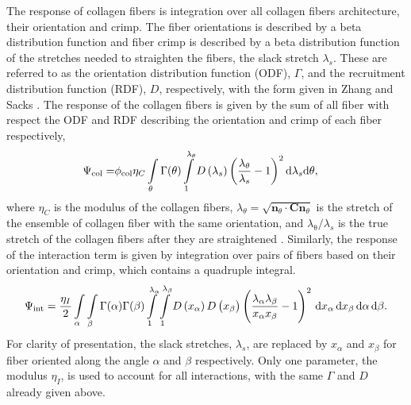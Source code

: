 	The response of collagen fibers is integration over all collagen fibers architecture, their orientation and crimp. The fiber orientations is described by a beta distribution function and fiber crimp is described by a beta distribution function of the stretches needed to straighten the fibers, the slack stretch $\lambda_s$. These are referred to as the orientation distribution function (ODF), $\Gamma$, and the recruitment distribution function (RDF), $D$, respectively, with the form given in Zhang and Sacks \cite{zhang_meso_2016, zhang_modeling_2017, sacks_novel_2016}. The response of the collagen fibers is given by the sum of all fiber with respect the ODF and RDF describing the orientation and crimp of each fiber respectively,
\begin{equation} \label{eqn:collagen}
\begin{aligned}
\Psi_\mathrm{col} =& \phi_\mathrm{col} \eta_C \int\displaylimits_\theta \Gamma(\theta) 
\int\displaylimits_1^{\lambda_\theta} D\left(\lambda_s \right) \left( \frac{\lambda_\theta}{\lambda_s} - 1\right)^2 \mathrm{d}\lambda_s \mathrm{d}\theta,
\end{aligned}
\end{equation}
where $\eta_C$ is the modulus of the collagen fibers, $\lambda_\theta = \sqrt{\mathbf{n}_\theta \cdot \mathbf{C}\mathbf{n}_\theta}$ is the stretch of the ensemble of collagen fiber with the same orientation, and $\lambda_\mathrm{\theta}/\lambda_s$ is the true stretch of the collagen fibers after they are straightened \cite{zhang_meso_2016}. Similarly, the response of the interaction term is given by integration over pairs of fibers based on their orientation and crimp, which contains a quadruple integral. 
\begin{equation}
\Psi_\mathrm{int} = \frac{\eta_I}{2} \int\displaylimits_\alpha \int\displaylimits_\beta \Gamma(\alpha) \Gamma(\beta) \int\displaylimits_1^{\lambda_\alpha} \int\displaylimits_1^{\lambda_\beta} D\left( x_\alpha \right) D\left( x_\beta \right) \left( \frac{\lambda_\alpha \lambda_\beta}{x_\alpha x_\beta} - 1\right)^2 \,\mathrm{d}x_\alpha \,\mathrm{d}x_\beta \,\mathrm{d}\alpha \,\mathrm{d}\beta.
\end{equation}
For clarity of presentation, the slack stretches, $\lambda_s$, are replaced by $x_\alpha$ and $x_\beta$ for fiber oriented along the angle $\alpha$ and $\beta$ respectively. Only one parameter, the modulus $\eta_I$, is used to account for all interactions, with the same $\Gamma$ and $D$ already given above. 

